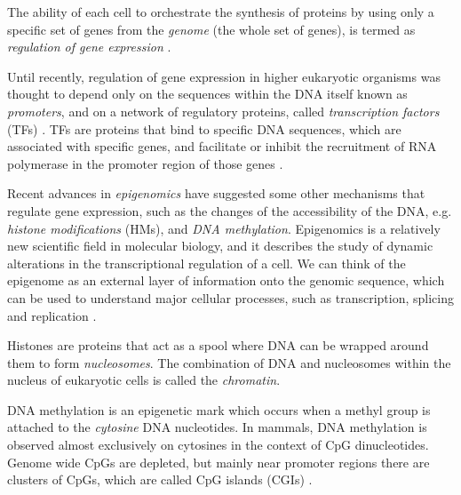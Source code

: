 The ability of each cell to orchestrate the synthesis of proteins by using only a specific set of genes from the \emph{genome} (\ie the whole set of genes), is termed as \emph{regulation of gene expression} \citep{Jasny2001}.

Until recently, regulation of gene expression in higher eukaryotic organisms was thought to depend only on the sequences within the DNA itself known as \emph{promoters}, and on a network of regulatory proteins, called \emph{transcription factors} (TFs) \citep{Jasny2001}. TFs are proteins that bind to specific DNA sequences, which are associated with specific genes, and facilitate or inhibit the recruitment of RNA polymerase in the promoter region of those genes \citep{Ptashne2002}. 

Recent advances in \emph{epigenomics} have suggested some other mechanisms that regulate gene expression, such as the changes of the accessibility of the DNA, e.g. \emph{histone modifications} (HMs), and \emph{DNA methylation}. Epigenomics is a relatively new scientific field in molecular biology, and it describes the study of dynamic alterations in the transcriptional regulation of a cell. We can think of the epigenome as an external layer of information onto the genomic sequence, which can be used to understand major cellular processes, such as transcription, splicing and replication \citep{Furey2012}.

Histones are proteins that act as a spool where DNA can be wrapped around them to form \emph{nucleosomes}. The combination of DNA and nucleosomes within the nucleus of eukaryotic cells is called the \emph{chromatin}. 

DNA methylation is an epigenetic mark which occurs when a methyl group is attached to the \emph{cytosine} DNA nucleotides. In mammals, DNA methylation is observed almost exclusively on cytosines in the context of CpG dinucleotides. Genome wide CpGs are depleted, but mainly near promoter regions there are clusters of CpGs, which are called CpG islands (CGIs) \citep{Bird2002,Illingworth2009}. 

